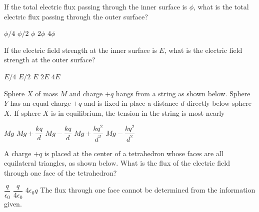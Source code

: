 \documentclass[12pt]{../oss-classkick-exam}
\begin{document}
\begin{questions}
  \question If the total electric flux passing through the inner surface is
  $\phi$, what is the total electric flux passing through the outer surface?
  \begin{choices}
    \choice $\phi/4$
    \choice $\phi/2$
    \choice $\phi$
    \choice $2\phi$
    \choice $4\phi$
  \end{choices}
  \label{sphere1}
  
  \question If the electric field strength at the inner surface is $E$, what is
  the electric field strength at the outer surface?
  \begin{choices}
    \choice $E/4$
    \choice $E/2$
    \choice $E$
    \choice $2E$
    \choice $4E$
  \end{choices}
  \label{sphere2}
  
  \uplevel{\rule{\linewidth}{.5pt}}
  
  \question Sphere $X$ of mass $M$ and charge $+q$ hangs from a string as shown
  below. Sphere $Y$ has an equal charge $+q$ and is fixed in place a distance
  $d$ directly below sphere $X$. If sphere $X$ is in equilibrium, the tension
  in the string is most nearly

  \begin{minipage}{.35\linewidth}
  \end{minipage}
  \begin{minipage}{.5\linewidth}
    \begin{choices}
      \choice$Mg$
      \choice$Mg+\dfrac{kq}d$
      \choice$Mg-\dfrac{kq}d$
      \choice$Mg+\dfrac{kq^2}{d^2}$
      \choice$Mg-\dfrac{kq^2}{d^2}$
    \end{choices}
  \end{minipage}
  
  \uplevel{\rule{\linewidth}{.5pt}}
  
  \question A charge $+q$ is placed at the center of a tetrahedron whose faces
  are all equilateral triangles, as shown below. What is the flux of the
  electric field through one face of the tetrahedron?

  \begin{minipage}{.3\linewidth}
  \end{minipage}
  \begin{minipage}{.69\linewidth}
    \begin{choices}
      \choice$\dfrac q{\epsilon_0}$
      \choice$\dfrac q{4\epsilon_0}$
      \choice$4\epsilon_0q$
      \choice The flux through one face cannot be determined from the
      information given.
    \end{choices}
  \end{minipage}
  \newpage
  

\end{questions}
\end{document}
